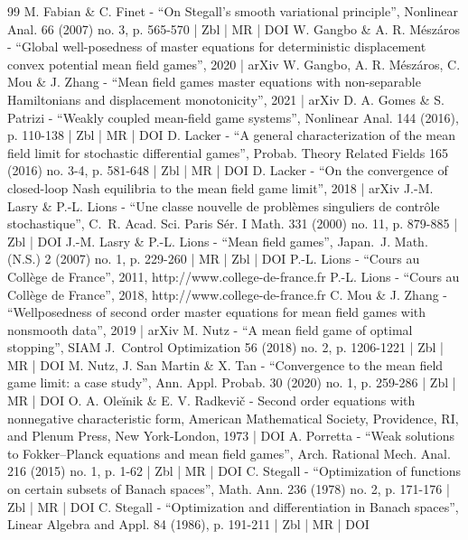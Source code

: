 \documentclass[10pt]{amsart}
\theoremstyle{definition}
\begin{document}
\begin{thebibliography}{99}
M. Fabian \& C. Finet - “On Stegall’s smooth variational principle”, Nonlinear Anal. 66 (2007) no. 3, p. 565-570 | Zbl | MR | DOI
W. Gangbo \& A. R. Mészáros - “Global well-posedness of master equations for deterministic displacement convex potential mean field games”, 2020 | arXiv
W. Gangbo, A. R. Mészáros, C. Mou \& J. Zhang - “Mean field games master equations with non-separable Hamiltonians and displacement monotonicity”, 2021 | arXiv
D. A. Gomes \& S. Patrizi - “Weakly coupled mean-field game systems”, Nonlinear Anal. 144 (2016), p. 110-138 | Zbl | MR | DOI
D. Lacker - “A general characterization of the mean field limit for stochastic differential games”, Probab. Theory Related Fields 165 (2016) no. 3-4, p. 581-648 | Zbl | MR | DOI
D. Lacker - “On the convergence of closed-loop Nash equilibria to the mean field game limit”, 2018 | arXiv
J.-M. Lasry \& P.-L. Lions - “Une classe nouvelle de problèmes singuliers de contrôle stochastique”, C. R. Acad. Sci. Paris Sér. I Math. 331 (2000) no. 11, p. 879-885 | Zbl | DOI
J.-M. Lasry \& P.-L. Lions - “Mean field games”, Japan. J. Math. (N.S.) 2 (2007) no. 1, p. 229-260 | MR | Zbl | DOI
P.-L. Lions - “Cours au Collège de France”, 2011, http://www.college-de-france.fr
P.-L. Lions - “Cours au Collège de France”, 2018, http://www.college-de-france.fr
C. Mou \& J. Zhang - “Wellposedness of second order master equations for mean field games with nonsmooth data”, 2019 | arXiv
M. Nutz - “A mean field game of optimal stopping”, SIAM J. Control Optimization 56 (2018) no. 2, p. 1206-1221 | Zbl | MR | DOI
M. Nutz, J. San Martin \& X. Tan - “Convergence to the mean field game limit: a case study”, Ann. Appl. Probab. 30 (2020) no. 1, p. 259-286 | Zbl | MR | DOI
O. A. Oleĭnik \& E. V. Radkevič - Second order equations with nonnegative characteristic form, American Mathematical Society, Providence, RI, and Plenum Press, New York-London, 1973 | DOI
A. Porretta - “Weak solutions to Fokker–Planck equations and mean field games”, Arch. Rational Mech. Anal. 216 (2015) no. 1, p. 1-62 | Zbl | MR | DOI
C. Stegall - “Optimization of functions on certain subsets of Banach spaces”, Math. Ann. 236 (1978) no. 2, p. 171-176 | Zbl | MR | DOI
C. Stegall - “Optimization and differentiation in Banach spaces”, Linear Algebra and Appl. 84 (1986), p. 191-211 | Zbl | MR | DOI
\end{thebibliography}
\end{document}
